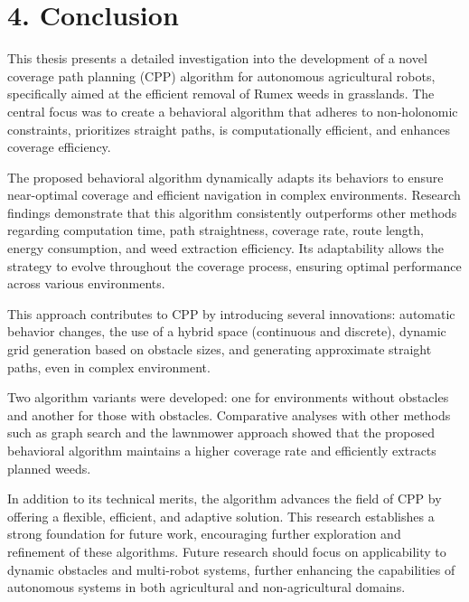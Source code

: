 
\chapter{4. Conclusion}

This thesis presents a detailed investigation into the development of a novel coverage path planning (CPP) algorithm for autonomous agricultural robots, specifically aimed at the efficient removal of Rumex weeds in grasslands. The central focus was to create a behavioral algorithm that adheres to non-holonomic constraints, prioritizes straight paths, is computationally efficient, and enhances coverage efficiency.

\vspace*{6mm}   

The proposed behavioral algorithm dynamically adapts its behaviors to ensure near-optimal coverage and efficient navigation in complex environments. Research findings demonstrate that this algorithm consistently outperforms other methods regarding computation time, path straightness, coverage rate, route length, energy consumption, and weed extraction efficiency. Its adaptability allows the strategy to evolve throughout the coverage process, ensuring optimal performance across various environments.

\vspace*{6mm}   

This approach contributes to CPP by introducing several innovations: automatic behavior changes, the use of a hybrid space (continuous and discrete), dynamic grid generation based on obstacle sizes, and  generating approximate straight paths, even in complex environment.

\vspace*{6mm}   

Two algorithm variants were developed: one for environments without obstacles and another for those with obstacles. Comparative analyses with other methods such as graph search and the lawnmower approach showed that the proposed behavioral algorithm maintains a higher coverage rate and efficiently extracts planned weeds.

\vspace*{6mm}   

In addition to its technical merits, the algorithm advances the field of CPP by offering a flexible, efficient, and adaptive solution. This research establishes a strong foundation for future work, encouraging further exploration and refinement of these algorithms. Future research should focus on applicability to dynamic obstacles and multi-robot systems, further enhancing the capabilities of autonomous systems in both agricultural and non-agricultural domains.
\newpage
